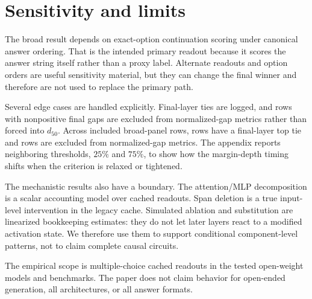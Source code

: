 \section{Sensitivity and limits}

The broad result depends on exact-option continuation scoring under canonical answer ordering. That is the intended primary readout because it scores the answer string itself rather than a proxy label. Alternate readouts and option orders are useful sensitivity material, but they can change the final winner and therefore are not used to replace the primary path.

Several edge cases are handled explicitly. Final-layer ties are logged, and rows with nonpositive final gaps are excluded from normalized-gap metrics rather than forced into $d_{50}$. Across included broad-panel rows, \FinalLayerTieCount{} rows have a final-layer top tie and \NormalizedGapExcludedCount{} rows are excluded from normalized-gap metrics. The appendix reports neighboring thresholds, $25\%$ and $75\%$, to show how the margin-depth timing shifts when the criterion is relaxed or tightened.

The mechanistic results also have a boundary. The attention/MLP decomposition is a scalar accounting model over cached readouts. Span deletion is a true input-level intervention in the legacy cache. Simulated ablation and substitution are linearized bookkeeping estimates: they do not let later layers react to a modified activation state. We therefore use them to support conditional component-level patterns, not to claim complete causal circuits.

The empirical scope is multiple-choice cached readouts in the tested open-weight models and benchmarks. The paper does not claim behavior for open-ended generation, all architectures, or all answer formats.
